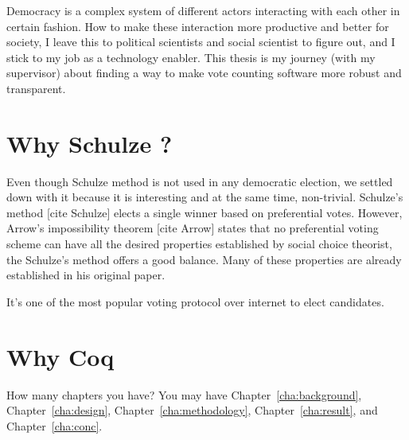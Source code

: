 Democracy is a complex system of different actors interacting with each other in certain fashion.  How to make 
these interaction more productive and better for society, I leave this to political scientists and social scientist
to figure out, and I stick to my job as a technology enabler.  This thesis is  my journey 
(with my supervisor) about finding  a way to make vote counting software more robust and transparent.




\section{Why Schulze ?}
\label{sec:thesisstatement}
Even though Schulze method is not used in any democratic election, we settled down 
with it because it is interesting and at the same time, non-trivial.  Schulze's method [cite Schulze]  elects 
a single winner based on 
preferential votes.  However, Arrow's impossibility theorem [cite Arrow]  states that no preferential voting 
scheme can have all the desired properties established by  social choice theorist,
the Schulze's method offers a good balance. Many of these properties are already 
established in his original paper. 



It's one of the most popular voting protocol 
over internet to elect candidates. 






\section{Why Coq}
\label{sec:outline}
How many chapters you have? You may have Chapter~\ref{cha:background},
Chapter~\ref{cha:design}, Chapter~\ref{cha:methodology},
Chapter~\ref{cha:result}, and Chapter~\ref{cha:conc}.
